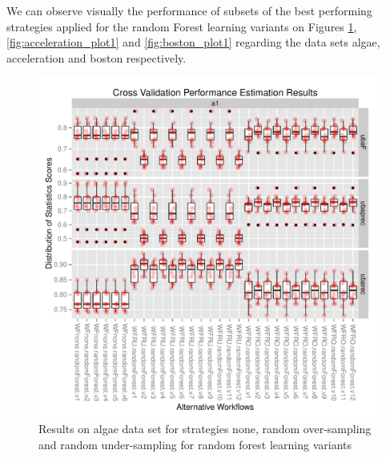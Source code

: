 \documentclass[10pt,a4paper]{article}\usepackage[]{graphicx}\usepackage[]{color}
\makeatletter
\def\maxwidth{ %
  \ifdim\Gin@nat@width>\linewidth
    \linewidth
  \else
    \Gin@nat@width
  \fi
}
\newenvironment{knitrout}{}{} %
\makeatother
\begin{document}
We can observe visually the performance of subsets of the best performing strategies applied for the random Forest learning variants on Figures \ref{fig:algae_plot1}, \ref{fig:acceleration_plot1} and \ref{fig:boston_plot1} regarding the data sets algae, acceleration and boston respectively.

\begin{knitrout}\footnotesize
{}\color{fgcolor}\begin{figure}

{\centering \includegraphics[width=\maxwidth]{figures/UBL-algae_plot1-1} 

}

\caption[Results on algae data set for strategies none, random over-sampling and random under-sampling for random forest learning variants]{Results on algae data set for strategies none, random over-sampling and random under-sampling for random forest learning variants}\label{fig:algae_plot1}
\end{figure}


\end{knitrout}
\end{document}
